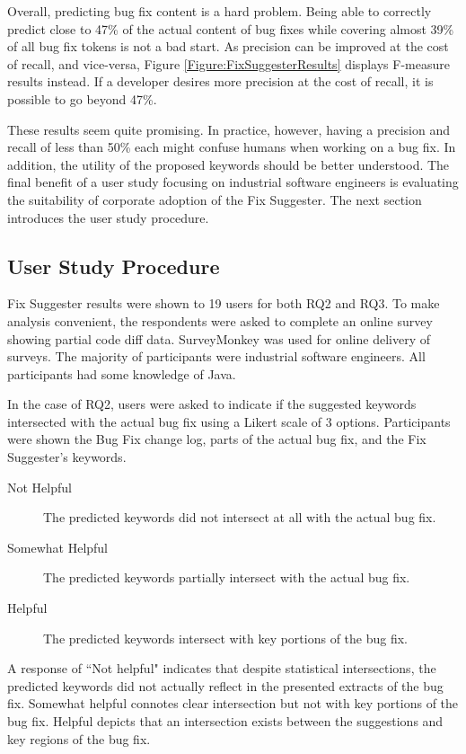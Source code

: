 \documentclass[conference]{IEEEtran}
\begin{document}
Overall, predicting bug fix content is a hard problem. Being able to correctly predict close to 47\% of the actual content of bug fixes while covering almost 39\% of all bug fix tokens is not a bad start. As precision can be improved at the cost of recall, and vice-versa, Figure \ref{Figure:FixSuggesterResults} displays F-measure results instead. If a developer desires more precision at the cost of recall, it is possible to go beyond 47\%. 

These results seem quite promising. In practice, however, having a precision and recall of less than 50\% each might confuse humans when working on a bug fix. In addition, the utility of the proposed keywords should be better understood. The final benefit of a user study focusing on industrial software engineers is evaluating the suitability of corporate adoption of the Fix Suggester. The next section introduces the user study procedure.

\subsection{User Study Procedure}
Fix Suggester results were shown to 19 users for both RQ2 and RQ3. To make analysis convenient, the respondents were asked to complete an online survey showing partial code diff data. SurveyMonkey was used for online delivery of surveys. The majority of participants were industrial software engineers. All participants had some knowledge of Java.

In the case of RQ2, users were asked to indicate if the suggested keywords intersected with the actual bug fix using a Likert scale of 3 options. Participants were shown the Bug Fix change log, parts of the actual bug fix, and the Fix Suggester's keywords.

\begin{description}
	\item[Not Helpful] The predicted keywords did not intersect at all with the actual bug fix.
	\item[Somewhat Helpful] The predicted keywords partially intersect with the actual bug fix.
	\item[Helpful] The predicted keywords intersect with key portions of the bug fix.
\end{description}

A response of ``Not helpful" indicates that despite statistical intersections, the predicted keywords did not actually reflect in the presented extracts of the bug fix. Somewhat helpful connotes clear intersection but not with key portions of the bug fix. Helpful depicts that an intersection exists between the suggestions and key regions of the bug fix.
\end{document}
